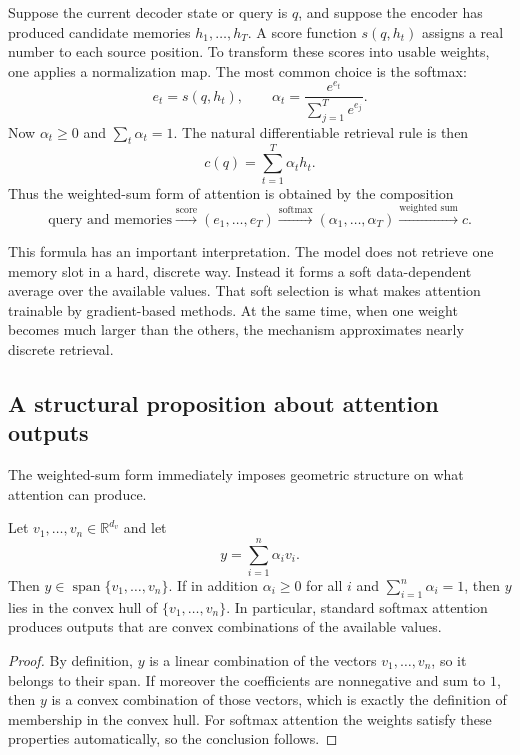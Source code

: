 \medskip

Suppose the current decoder state or query is $q$, and suppose the encoder has produced candidate memories $h_1,\dots,h_T$.
A score function $s(q,h_t)$ assigns a real number to each source position.
To transform these scores into usable weights, one applies a normalization map.
The most common choice is the softmax:
\[
 e_t = s(q,h_t),
 \qquad
 \alpha_t = \frac{e^{e_t}}{\sum_{j=1}^{T} e^{e_j}}.
\]
Now $\alpha_t\ge 0$ and $\sum_t \alpha_t=1$.
The natural differentiable retrieval rule is then
\[
 c(q)=\sum_{t=1}^{T}\alpha_t h_t.
\]
Thus the weighted-sum form of attention is obtained by the composition
\[
 \text{query and memories}
 \xrightarrow{\text{score}}
 (e_1,\dots,e_T)
 \xrightarrow{\text{softmax}}
 (\alpha_1,\dots,\alpha_T)
 \xrightarrow{\text{weighted sum}}
 c.
\]

\medskip

This formula has an important interpretation.
The model does not retrieve one memory slot in a hard, discrete way.
Instead it forms a soft data-dependent average over the available values.
That soft selection is what makes attention trainable by gradient-based methods.
At the same time, when one weight becomes much larger than the others, the mechanism approximates nearly discrete retrieval.

\subsection*{A structural proposition about attention outputs}

The weighted-sum form immediately imposes geometric structure on what attention can produce.

\begin{proposition}
Let $v_1,\dots,v_n\in\mathbb{R}^{d_v}$ and let
\[
 y = \sum_{i=1}^{n}\alpha_i v_i.
\]
Then $y\in \operatorname{span}\{v_1,\dots,v_n\}$.
If in addition $\alpha_i\ge 0$ for all $i$ and $\sum_{i=1}^{n}\alpha_i=1$, then $y$ lies in the convex hull of $\{v_1,\dots,v_n\}$.
In particular, standard softmax attention produces outputs that are convex combinations of the available values.
\end{proposition}

\begin{proof}
By definition, $y$ is a linear combination of the vectors $v_1,\dots,v_n$, so it belongs to their span.
If moreover the coefficients are nonnegative and sum to $1$, then $y$ is a convex combination of those vectors, which is exactly the definition of membership in the convex hull.
For softmax attention the weights satisfy these properties automatically, so the conclusion follows.
\end{proof}

